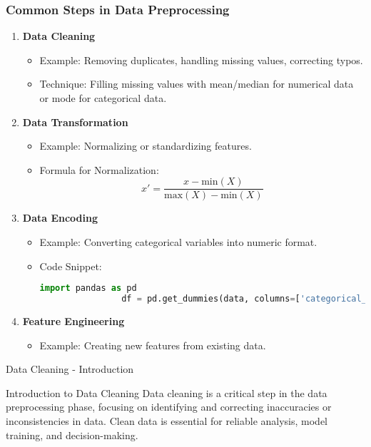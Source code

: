 \documentclass[aspectratio=169]{beamer}
\begin{document}
\begin{frame}[fragile]
    \frametitle{Common Steps in Data Preprocessing}
    \begin{enumerate}
        \item \textbf{Data Cleaning}
            \begin{itemize}
                \item Example: Removing duplicates, handling missing values, correcting typos.
                \item Technique: Filling missing values with mean/median for numerical data or mode for categorical data.
            \end{itemize}
        \item \textbf{Data Transformation}
            \begin{itemize}
                \item Example: Normalizing or standardizing features.
                \item Formula for Normalization:
                \begin{equation}
                    x' = \frac{x - \text{min}(X)}{\text{max}(X) - \text{min}(X)}
                \end{equation}
            \end{itemize}
        \item \textbf{Data Encoding}
            \begin{itemize}
                \item Example: Converting categorical variables into numeric format.
                \item Code Snippet:
                \begin{lstlisting}[language=Python]
                import pandas as pd
                df = pd.get_dummies(data, columns=['categorical_variable'])
                \end{lstlisting}
            \end{itemize}
        \item \textbf{Feature Engineering}
            \begin{itemize}
                \item Example: Creating new features from existing data.
            \end{itemize}
    \end{enumerate}
\end{frame}

\begin{frame}[fragile]{Data Cleaning - Introduction}
    \begin{block}{Introduction to Data Cleaning}
        Data cleaning is a critical step in the data preprocessing phase, focusing on identifying and correcting inaccuracies or inconsistencies in data. 
        Clean data is essential for reliable analysis, model training, and decision-making.
    \end{block}
\end{frame}
\end{document}

